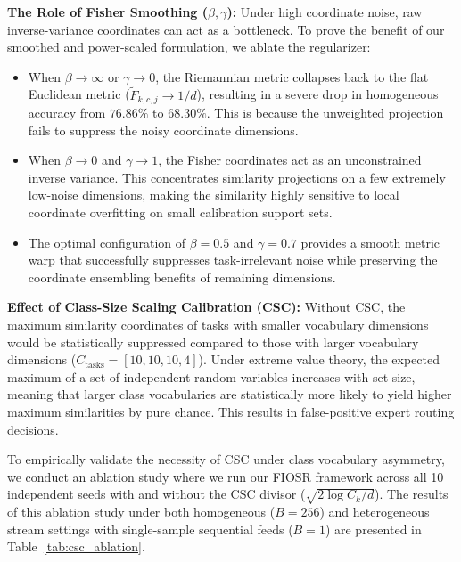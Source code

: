 \textbf{The Role of Fisher Smoothing ($\beta, \gamma$):}
Under high coordinate noise, raw inverse-variance coordinates can act as a bottleneck. To prove the benefit of our smoothed and power-scaled formulation, we ablate the regularizer:
\begin{itemize}\setlength{\itemsep}{0.5pt}\setlength{\parskip}{0pt}
    \item When $\beta \to \infty$ or $\gamma \to 0$, the Riemannian metric collapses back to the flat Euclidean metric ($\tilde{F}_{k, c, j} \to 1/d$), resulting in a severe drop in homogeneous accuracy from $76.86\%$ to $68.30\%$. This is because the unweighted projection fails to suppress the noisy coordinate dimensions.
    \item When $\beta \to 0$ and $\gamma \to 1$, the Fisher coordinates act as an unconstrained inverse variance. This concentrates similarity projections on a few extremely low-noise dimensions, making the similarity highly sensitive to local coordinate overfitting on small calibration support sets.
    \item The optimal configuration of $\beta = 0.5$ and $\gamma = 0.7$ provides a smooth metric warp that successfully suppresses task-irrelevant noise while preserving the coordinate ensembling benefits of remaining dimensions.
\end{itemize}

\textbf{Effect of Class-Size Scaling Calibration (CSC):}
Without CSC, the maximum similarity coordinates of tasks with smaller vocabulary dimensions would be statistically suppressed compared to those with larger vocabulary dimensions ($C_{\text{tasks}} = [10, 10, 10, 4]$). Under extreme value theory, the expected maximum of a set of independent random variables increases with set size, meaning that larger class vocabularies are statistically more likely to yield higher maximum similarities by pure chance. This results in false-positive expert routing decisions.

To empirically validate the necessity of CSC under class vocabulary asymmetry, we conduct an ablation study where we run our FIOSR framework across all 10 independent seeds with and without the CSC divisor ($\sqrt{2\log C_k / d}$). The results of this ablation study under both homogeneous ($B=256$) and heterogeneous stream settings with single-sample sequential feeds ($B=1$) are presented in Table~\ref{tab:csc_ablation}.

